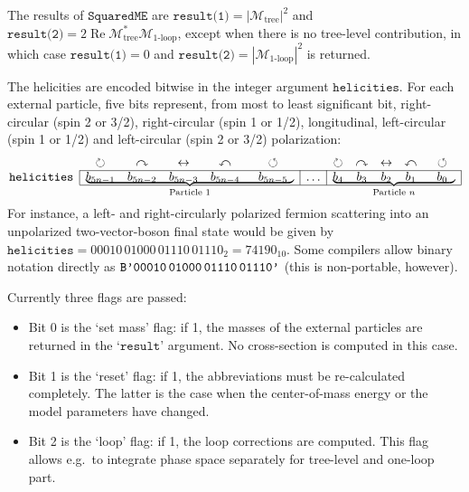 \documentclass[twoside,11pt]{article}
\def\Code#1{\ensuremath{\texttt{#1}}}
\def\limfunc#1{\mathop{\mathrm{#1}}}
\def\Re{\limfunc{Re}}
\def\eg{e.g.\ }
\def\M{\mathcal{M}}
\def\Mtree{\M_{\text{tree}}}
\def\Mloop{\M_{\text{1-loop}}}
\begin{document}
The results of \Code{SquaredME} are $\Code{result(1)} = |\Mtree|^2$ 
and $\Code{result(2)} = 2\Re\Mtree^* \Mloop$, except when there is no 
tree-level contribution, in which case $\Code{result(1)} = 0$ and 
$\Code{result(2)} = |\Mloop|^2$ is returned.

The helicities are encoded bitwise in the integer argument
\Code{helicities}.  For each external particle, five bits represent,
from most to least significant bit, right-circular (spin 2 or 3/2),
right-circular (spin 1 or 1/2), longitudinal, left-circular (spin 1 or
1/2) and left-circular (spin 2 or 3/2) polarization:
$$
\begin{array}{cccccccccccc}
       & \circlearrowright
       & \curvearrowright
       & \leftrightarrow
       & \curvearrowleft
       & \circlearrowleft
       &
       & \circlearrowright
       & \curvearrowright
       & \leftrightarrow
       & \curvearrowleft
       & \circlearrowleft \\
\cline{2-12}
\kern -1ex\Code{helicities}
       & \multicolumn{1}{|c}{b_{5n-1}}
	& b_{5n-2} & b_{5n-3} & b_{5n-4}
         & \multicolumn{1}{c|}{b_{5n-5}}
       & \multicolumn{1}{c|}{\ldots}
       & b_4 & b_3 & b_2 & b_1
	& \multicolumn{1}{c|}{b_0} \\
\cline{2-12} \\[-6ex]
       & \multicolumn{5}{c}{\underbrace{\hspace*{17em}}_
            {\text{Particle 1}}}
       &
       & \multicolumn{5}{c}{\underbrace{\hspace*{10em}}_
            {\text{Particle $n$}}} \\
\end{array}
$$
For instance, a left- and right-circularly polarized fermion scattering 
into an unpolarized two-vector-boson final state would be given by 
$\Code{helicities} = 00010\,01000\,01110\,01110_2 = 74190_{10}$.  Some 
compilers allow binary notation directly as 
\Code{B'00010\,01000\,01110\,01110'} (this is non-portable, however).

Currently three flags are passed:
\begin{itemize}
\item
Bit 0 is the `set mass' flag: if 1, the masses of the external particles 
are returned in the `\Code{result}' argument.  No cross-section is 
computed in this case.

\item
Bit 1 is the `reset' flag: if 1, the abbreviations must be re-calculated 
completely.  The latter is the case when the center-of-mass energy or 
the model parameters have changed.

\item
Bit 2 is the `loop' flag: if 1, the loop corrections are computed.
This flag allows \eg to integrate phase space separately for tree-level 
and one-loop part.
\end{itemize}
\end{document}
